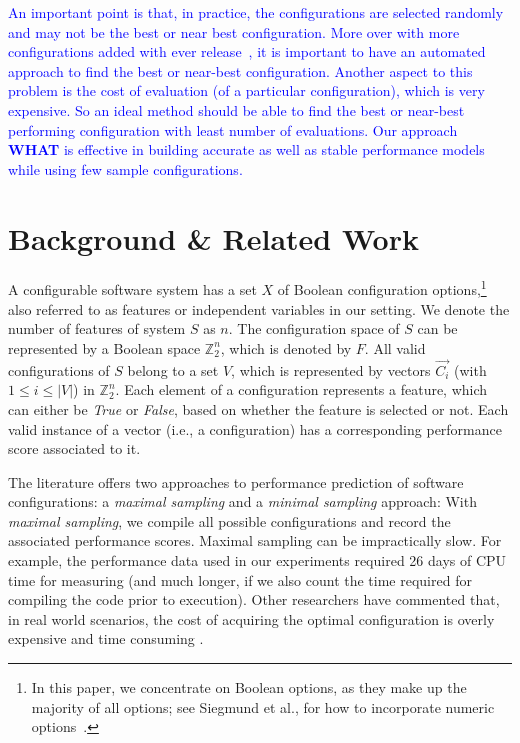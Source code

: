 \documentclass[smallextended]{svjour3}       %
\newcommand{\what}{{\bf WHAT}\xspace}
\begin{document}
\textcolor{blue}{
An important point is that, in practice, the configurations are selected randomly and may not be the best or near best configuration. More over with more configurations added with ever release~\cite{xu2015hey}, it is important to have an automated approach to find the best or near-best configuration. Another aspect to this problem is the cost of evaluation (of a particular configuration), which is very expensive. So an ideal method should be able to find the best or near-best performing configuration with least number of evaluations. Our approach \what{} is effective in building accurate as well as stable performance models while using few sample configurations. }
 
\section{Background \& Related Work}  
\label{sect:addit}

A configurable software system has a set $X$ of Boolean configuration options,\footnote{In this paper, we concentrate on Boolean options, as they make up the majority of all options; see Siegmund et al., for how to incorporate numeric options~\cite{SGA+15}.} also referred to as features or independent variables in our setting.
We denote the number of features of system $S$ as $n$. The configuration space of $S$ can be represented by a Boolean space $\mathbb{Z}_{2}^{n}$, which is denoted by $F$. All valid configurations of $S$ belong to a set $V$, 
which is represented by vectors $\vec{C_i}$ (with $1\leq i\leq \left\vert{V}\right\vert$) in $\mathbb{Z}_{2}^{n}$. Each element of a configuration represents a feature, which can either be \emph{True} or \emph{False}, based on whether the feature is selected or not. 
Each valid instance of a vector (i.e., a configuration) has a corresponding performance score associated to it. 

The literature offers two approaches to performance prediction of software configurations: a {\em maximal sampling} and a {\em minimal sampling} approach: 
With {\em maximal sampling}, we compile all  possible configurations and record the associated performance scores. 
Maximal sampling  can be impractically slow. For example, the performance data used in our experiments required  26 days of CPU time for measuring (and much longer, if we also count the time required for compiling the code prior to execution). 
 Other researchers have commented that,  in 
 real world scenarios, the cost of acquiring the optimal configuration is overly expensive and time consuming \cite{weiss2008maximizing}.
 
\end{document}
